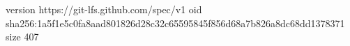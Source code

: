 version https://git-lfs.github.com/spec/v1
oid sha256:1a5f1e5c0fa8aad801826d28c32c65595845f856d68a7b826a8dc68dd1378371
size 407
